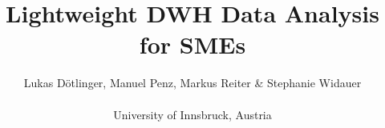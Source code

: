 \usepackage{lmodern}
\usepackage[english]{babel}

\usepackage{fontspec}

\usepackage{multicol}

\usepackage{listings}

\usepackage{graphicx}
\graphicspath{{assets/}}

\title{Lightweight DWH Data Analysis for SMEs}
\author{Lukas Dötlinger, Manuel Penz, Markus Reiter \& Stephanie Widauer \\
  \\
  University of Innsbruck, Austria
}
\date{}
